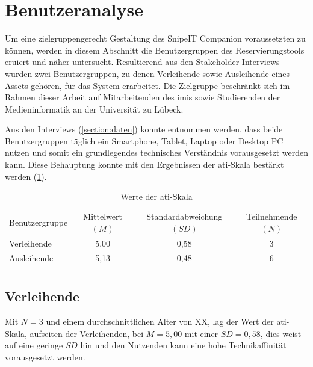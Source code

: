 \section{Benutzeranalyse}
\label{section:benutzer}
Um eine zielgruppengerecht Gestaltung des SnipeIT Companion voraussetzten zu können, werden in
diesem Abschnitt die Benutzergruppen des Reservierungstools eruiert und näher untersucht.
Resultierend aus den Stakeholder-Interviews wurden zwei Benutzergruppen, zu denen Verleihende sowie
Ausleihende eines Assets gehören, für das System erarbeitet. Die Zielgruppe beschränkt sich im
Rahmen dieser Arbeit auf Mitarbeitenden des \ac{imis} sowie  Studierenden der Medieninformatik an
der Universität zu Lübeck.

Aus den Interviews (\ref{section:daten}) konnte entnommen werden, dass beide Benutzergruppen täglich
ein Smartphone, Tablet, Laptop oder Desktop PC nutzen und somit ein grundlegendes technisches
Verständnis vorausgesetzt werden kann. Diese Behauptung konnte mit den Ergebnissen der
\ac{ati}-Skala bestärkt werden (\ref{table:ati}). 

\begin{table}[h]
        \centering
        \caption{Werte der \ac{ati}-Skala}
        \begin{tabular}{lccc}
                \arrayrulecolor{maincolor}\arrayrulecolor{maincolor}\hline
                \sffamily\color{maincolor}Benutzergruppe & \sffamily\color{maincolor}Mittelwert
                $(M)$& \sffamily\color{maincolor}Standardabweichung $(SD)$ &
                \sffamily\color{maincolor}Teilnehmende $(N)$ \\
                \arrayrulecolor{maincolor}\arrayrulecolor{maincolor}\hline
                Verleihende & 5,00                                 & 0,58 & 3\\
                Ausleihende & 5,13                                 & 0,48 & 6\\
                \arrayrulecolor{maincolor}\arrayrulecolor{maincolor}\hline
        \end{tabular}
        \label{table:ati}
\end{table}

\subsection{Verleihende}
Mit $N=3$ und einem durchschnittlichen Alter von XX, lag der Wert der \ac{ati}-Skala, aufseiten der
Verleihenden, bei $M=5,00$ mit einer $SD=0,58$, dies weist auf eine geringe $SD$ hin und den
Nutzenden kann eine hohe Technikaffinität vorausgesetzt werden.

